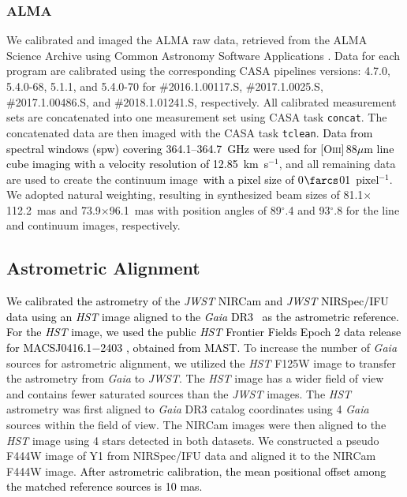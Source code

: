 \documentclass[trackchanges,twocolumn]{aastex701}
\newcommand{\ca}[1]{\textcolor{black}{#1}} %
\newcommand{\cb}[1]{\textcolor{black}{#1}} %
\newcommand{\cd}[1]{\textcolor{black}{#1}} %
\newcommand{\cj}[1]{\textcolor{black}{#1}}
\newcommand{\cl}[1]{\textcolor{black}{#1}}
\newcommand{\cn}[1]{\textcolor{black}{#1}}
\newcommand{\co}[1]{\textcolor{black}{#1}}
\begin{document}
\subsubsection{ALMA}
We calibrated and imaged the ALMA raw data, retrieved from the ALMA Science Archive using Common Astronomy Software Applications \citep[CASA; ][]{CASA2022}. Data for each program are calibrated using the corresponding CASA pipelines versions: 4.7.0, 5.4.0-68, 5.1.1, and 5.4.0-70 for \#2016.1.00117.S, \#2017.1.0025.S, \#2017.1.00486.S, and \#2018.1.01241.S, respectively. All calibrated measurement sets are concatenated into one measurement set using CASA task \texttt{concat}. The concatenated data are then imaged with the CASA task \texttt{tclean}. \cd{Data from spectral windows (spw) covering 364.1--364.7~GHz were used for [\textsc{Oiii}]\,88$\mu$m line cube imaging with a velocity resolution of 12.85~km~s$^{-1}$}, and all remaining data are used to create the continuum image~\ca{with a pixel size of 0$\farcs$01~pixel$^{-1}$}. We adopted natural weighting, resulting in synthesized beam sizes of 81.1$\times$112.2~mas and 73.9$\times$96.1~mas with position angles of 89$^{\circ}$.4 and 93$^{\circ}$.8 for the line and continuum images, respectively.



\subsection{Astrometric Alignment}
\cb{We calibrated the astrometry of the \textit{JWST} NIRCam and \textit{JWST} NIRSpec/IFU data using an \cj{\textit{HST} image aligned to the \textit{Gaia} DR3~\citep{Gaia2021}} as the astrometric reference.} \cl{For the \textit{HST} image, we used the public \textit{HST} Frontier Fields Epoch 2 data release for MACSJ0416.1$-$2403 \cn{\citep[Proposal ID: 13496; PI: J. Lotz;][]{Lotz2017}}, obtained from MAST.}
To increase the number of \textit{Gaia} sources for astrometric alignment, we utilized the \textit{HST} F125W image to transfer the astrometry from \textit{Gaia} to \textit{JWST}. The \textit{HST} image has a wider field of view and contains fewer saturated sources than the \textit{JWST} images. The \textit{HST} astrometry was first aligned to \textit{Gaia} DR3 catalog coordinates using 4 \textit{Gaia} sources within the field of view. The NIRCam images were then aligned to the \textit{HST} image using 4 stars detected in both datasets. 
We constructed a pseudo F444W image of Y1 from NIRSpec/IFU data and aligned it to the NIRCam F444W image. \co{After astrometric calibration, the mean positional offset among the matched reference sources is 10 mas.}
\end{document}

